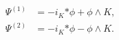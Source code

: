 \begin{equation}
\begin{aligned}
   \Psi^{(1)} &= - i_K {*\phi} + \phi \wedge K , \\
   \Psi^{(2)} &= - i_K {*\phi} - \phi \wedge K .
\end{aligned}
\end{equation}

